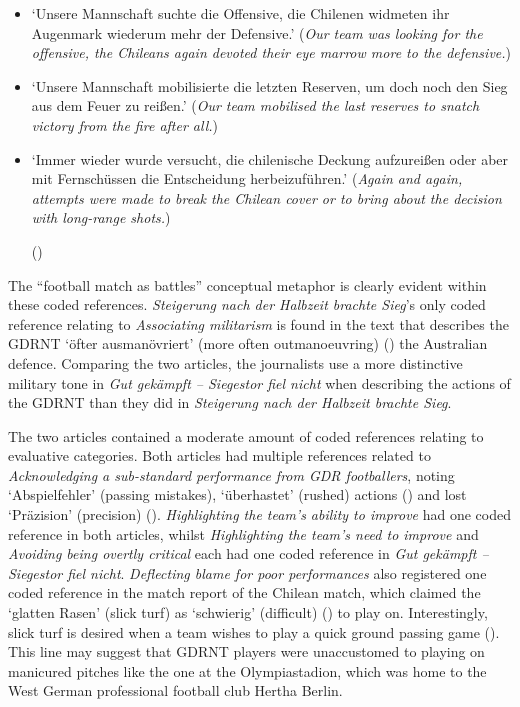 \begin{itemize}
    \item ‘Unsere Mannschaft suchte die Offensive, die Chilenen widmeten ihr Augenmark wiederum mehr der Defensive.’\newline
    (\textit{Our team was looking for the offensive, the Chileans again devoted their eye marrow more to the defensive.})
    \item ‘Unsere Mannschaft mobilisierte die letzten Reserven, um doch noch den Sieg aus dem Feuer zu reißen.’\newline
    (\textit{Our team mobilised the last reserves to snatch victory from the fire after all.})
    \item ‘Immer wieder wurde versucht, die chilenische Deckung aufzureißen oder aber mit Fernschüssen die Entscheidung herbeizuführen.’\newline
    (\textit{Again and again, attempts were made to break the Chilean cover or to bring about the decision with long-range shots.})
    \begin{flushright}\footnotesize (\cite{nd19740619})\end{flushright}
\end{itemize}

The “football match as battles” conceptual metaphor is clearly evident within these coded references. \textit{Steigerung nach der Halbzeit brachte Sieg}’s only coded reference relating to \textit{Associating militarism} is found in the text that describes the GDRNT ‘öfter ausmanövriert’ (more often outmanoeuvring) (\cite{nd19740615}) the Australian defence. Comparing the two articles, the journalists use a more distinctive military tone in \textit{Gut gekämpft – Siegestor fiel nicht} when describing the actions of the GDRNT than they did in \textit{Steigerung nach der Halbzeit brachte Sieg}.

The two articles contained a moderate amount of coded references relating to evaluative categories. Both articles had multiple references related to \textit{Acknowledging a sub-standard performance from GDR footballers}, noting ‘Abspielfehler’ (passing mistakes), ‘überhastet’ (rushed) actions (\cite{nd19740615}) and lost ‘Präzision’ (precision) (\cite{nd19740619}). \textit{Highlighting the team’s ability to improve} had one coded reference in both articles, whilst \textit{Highlighting the team’s need to improve} and \textit{Avoiding being overtly critical} each had one coded reference in \textit{Gut gekämpft – Siegestor fiel nicht}. \textit{Deflecting blame for poor performances} also registered one coded reference in the match report of the Chilean match, which claimed the ‘glatten Rasen’ (slick turf) as ‘schwierig’ (difficult) (\cite{nd19740619}) to play on. Interestingly, slick turf is desired when a team wishes to play a quick ground passing game (\cite{barnetthilditch1993}). This line may suggest that GDRNT players were unaccustomed to playing on manicured pitches like the one at the Olympiastadion, which was home to the West German professional football club Hertha Berlin.

